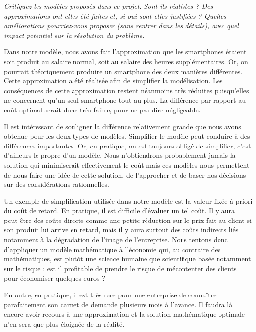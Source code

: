 \question %
\emph{Critiquez les modèles proposés dans ce projet. Sont-ils réalistes ?
Des approximations ont-elles été faites et, si oui sont-elles justifiées ?
Quelles améliorations pourriez-vous proposer (sans rentrer dans les détails),
avec quel impact potentiel sur la résolution du problème.}


Dans notre modèle, nous avons fait l'approximation que les smartphones étaient soit produit au salaire normal, soit au salaire des heures supplémentaires. Or, on pourrait théoriquement produire un smartphone des deux manières différentes. Cette approximation a été réalisée afin de simplifier la modélisation. Les conséquences de cette approximation restent néanmoins très réduites puisqu'elles ne concernent qu'un seul smartphone tout au plus. La différence par rapport au coût optimal serait donc très faible, pour ne pas dire négligeable.

Il est intéressant de souligner la différence relativement grande que nous avons obtenue pour les deux types de modèles. Simplifier le modèle peut conduire à des différences importantes. Or, en pratique, on est toujours obligé de simplifier, c'est d'ailleurs le propre d'un modèle. Nous n'obtiendrons probablement jamais la solution qui minimiserait effectivement le coût mais ces modèles nous permettent de nous faire une idée de cette solution, de l'approcher et de baser nos décisions sur des considérations rationnelles. 

Un exemple de simplification utilisée dans notre modèle est la valeur fixée à priori du coût de retard. En pratique, il est difficile d'évaluer un tel coût. Il y aura peut-être des coûts directs comme une petite réduction sur le prix fait au client si son produit lui arrive en retard, mais il y aura surtout des coûts indirects liés notamment à la dégradation de l'image de l'entreprise. Nous tentons donc d'appliquer un modèle mathématique à l'économie qui, au contraire des mathématiques, est plutôt une science humaine que scientifique basée notamment sur le risque : est il profitable de prendre le risque de mécontenter des clients pour économiser quelques euros ?

En outre, en pratique, il est très rare pour une entreprise de connaître parafaitement son carnet de demande plusieurs mois à l'avance. Il faudra là encore avoir recours à une approximation et la solution mathématique optimale n'en sera que plus éloignée de la réalité.

